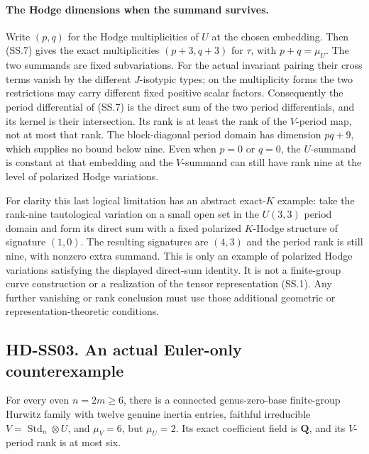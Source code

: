\paragraph{The Hodge dimensions when the summand survives.}
Write $(p,q)$ for the Hodge multiplicities of $U$ at the chosen
embedding.  Then (SS.7) gives the exact multiplicities
$(p+3,q+3)$ for $\tau$, with $p+q=\mu_U$.
The two summands are fixed subvariations.  For the actual invariant
pairing their cross terms vanish by the different $J$-isotypic
types; on the multiplicity forms the two restrictions may carry
different fixed positive scalar factors.
Consequently the period differential of (SS.7) is the direct sum
of the two period differentials, and its kernel is their
intersection.  Its rank is at least the rank of the $V$-period
map, not at most that rank.  The block-diagonal period domain
has dimension $pq+9$, which supplies no bound below nine.
Even when $p=0$ or $q=0$, the $U$-summand is constant at that
embedding and the $V$-summand can still have rank nine at the
level of polarized Hodge variations.

For clarity this last logical limitation has an abstract exact-$K$
example: take the rank-nine tautological variation on a small open
set in the $U(3,3)$ period domain and form its direct sum with a
fixed polarized $K$-Hodge structure of signature $(1,0)$.
The resulting signatures are $(4,3)$ and the period rank is
still nine, with nonzero extra summand.  This is only an example
of polarized Hodge variations satisfying the displayed direct-sum
identity.  It is not a finite-group curve construction or a
realization of the tensor representation (SS.1).  Any further
vanishing or rank conclusion must use those additional geometric
or representation-theoretic conditions.

\subsection*{HD-SS03. An actual Euler-only counterexample}

\begin{proposition}[HD-SS03]
For every even $n=2m\ge6$, there is a connected genus-zero-base
finite-group Hurwitz family with twelve genuine inertia entries,
faithful irreducible $V=\operatorname{Std}_n\otimes U$, and
$\mu_V=6$, but $\mu_U=2$.  Its exact coefficient field is
$\mathbf Q$, and its $V$-period rank is at most six.
\end{proposition}

